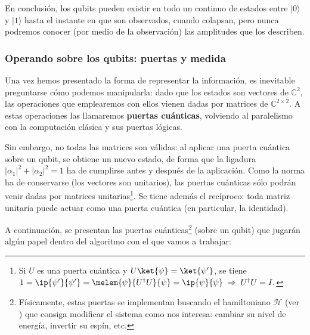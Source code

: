 \documentclass[11pt,a4paper,twoside,pdf]{article}
\numberwithin{equation}{section}
\begin{document}
		En conclusión, los qubits pueden existir en todo un continuo de estados entre $|0\rangle$ y $|1\rangle$ hasta el instante en que son observados, cuando colapsan, pero nunca podremos conocer (por medio de la observación) las amplitudes que los describen.
						
		\subsubsection{Operando sobre los qubits: puertas y medida} \label{subsubsec: puertas}
			
		Una vez hemos presentado la forma de representar la información, es inevitable preguntarse cómo podemos manipularla: dado que los estados son vectores de $\mathbb{C}^2$, las operaciones que emplearemos con ellos vienen dadas por matrices de $\mathbb{C}^{2\times 2}$. A estas operaciones las llamaremos \textbf{puertas cuánticas}, volviendo al paralelismo con la computación clásica y sus puertas lógicas.
				 
		Sin embargo, no todas las matrices son válidas: al aplicar una puerta cuántica sobre un qubit, se obtiene un nuevo estado, de forma que la ligadura $ |\alpha_1|^2+|\alpha_2|^2=1 $ ha de cumplirse antes y después de la aplicación. Como la norma ha de conservarse (los vectores son unitarios), las puertas cuánticas sólo podrán venir dadas por matrices unitarias\footnote{ Si $U$ es una puerta cuántica y $U\ket{\psi}=\ket{\psi'}$, se tiene $ 1 = \ip{\psi'}{\psi'} = \melem{\psi}{U^{\dagger}U}{\psi} = \ip{\psi}{\psi}  \; \Rightarrow \; U^{\dagger}U=I .$}.
		Se tiene además el recíproco: toda matriz unitaria puede actuar como una puerta cuántica (en particular, la identidad).
		
		A continuación, se presentan las puertas cuánticas\footnote{Físicamente, estas puertas se implementan buscando el hamiltoniano $\mathcal{H}$ (ver ) que consiga modificar el sistema como nos interesa: cambiar su nivel de energía, invertir su espín, etc.} (sobre un qubit) que jugarán algún papel dentro del algoritmo con el que vamos a trabajar:
		
\end{document}
